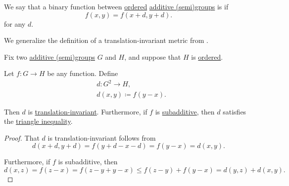 \begin{definition}\label{def:translation_invariant_binary_function}\mimprovised
   We say that a binary function between \hyperref[def:ordered_semigroup]{ordered} \hyperref[def:additive_semigroup]{additive (semi)groups} is  if
  \begin{equation*}
    f(x, y) = f(x + d, y + d).
  \end{equation*}
  for any \( d \).
\end{definition}
\begin{comments}
  \item We generalize the definition of a translation-invariant metric from \cite[88]{Deimling1985NonlinearFA}.
\end{comments}

\begin{proposition}\label{thm:subadditivity_to_triangle_inequality}
  Fix two \hyperref[def:additive_semigroup]{additive (semi)groups} \( G \) and \( H \), and suppose that \( H \) is \hyperref[def:ordered_semigroup]{ordered}.

  Let \( f: G \to H \) be any function. Define
  \begin{equation*}
    \begin{aligned}
      &d: G^2 \to H, \\
      &d(x, y) \coloneqq f(y - x).
    \end{aligned}
  \end{equation*}

  Then \( d \) is \hyperref[def:translation_invariant_binary_function]{translation-invariant}. Furthermore, if \( f \) is \hyperref[def:additive_function/sub]{subadditive}, then \( d \) satisfies the \hyperref[def:triangle_inequality]{triangle inequality}.
\end{proposition}
\begin{proof}
  That \( d \) is translation-invariant follows from
  \begin{equation*}
    d(x + d, y + d) = f(y + d - x - d) = f(y - x) = d(x, y).
  \end{equation*}

  Furthermore, if \( f \) is subadditive, then
  \begin{equation*}
    d(x, z) = f(z - x) = f(z - y + y - x) \leq f(z - y) + f(y - x) = d(y, z) + d(x, y).
  \end{equation*}
\end{proof}

